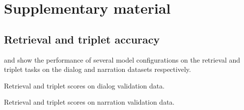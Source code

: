 \appendix

\section{Supplementary material}

\subsection{Retrieval and triplet accuracy}
 and  show
the performance of several model configurations on the retrieval and
triplet tasks on the dialog and narration datasets respectively.
 \begin{table*}[htb]
   \centering
   
   \caption{Retrieval and triplet scores on dialog validation data.}
   \label{tab:scores-dialog}
 \end{table*}

\begin{table*}[htb]
   \centering
   
   \caption{Retrieval and triplet scores on narration validation data.}
   \label{tab:scores-narration}
 \end{table*}

